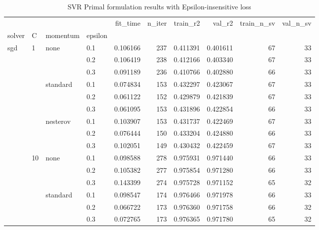 \begin{table}[H]
\centering
\caption{SVR Primal formulation results with Epsilon-insensitive loss}
\label{primal_svr_eps_cv_results}
\begin{tabular}{llllrrrrrr}
\toprule
          &     &   &     &  fit\_time &  n\_iter &  train\_r2 &    val\_r2 &  train\_n\_sv &  val\_n\_sv \\
solver & C & momentum & epsilon &           &         &           &           &             &           \\
\midrule
sgd & 1   & none & 0.1 &  0.106166 &     237 &  0.411391 &  0.401611 &          67 &        33 \\
          &     &   & 0.2 &  0.106419 &     238 &  0.412166 &  0.403340 &          67 &        33 \\
          &     &   & 0.3 &  0.091189 &     236 &  0.410766 &  0.402880 &          66 &        33 \\
          &     & standard & 0.1 &  0.074834 &     153 &  0.432297 &  0.423067 &          67 &        33 \\
          &     &   & 0.2 &  0.061122 &     152 &  0.429879 &  0.421839 &          67 &        33 \\
          &     &   & 0.3 &  0.061095 &     153 &  0.431896 &  0.422854 &          66 &        33 \\
          &     & nesterov & 0.1 &  0.103907 &     153 &  0.431737 &  0.422469 &          67 &        33 \\
          &     &   & 0.2 &  0.076444 &     150 &  0.433204 &  0.424880 &          66 &        33 \\
          &     &   & 0.3 &  0.102051 &     149 &  0.430432 &  0.422459 &          67 &        33 \\
          & 10  & none & 0.1 &  0.098588 &     278 &  0.975931 &  0.971440 &          66 &        33 \\
          &     &   & 0.2 &  0.105382 &     277 &  0.975854 &  0.971280 &          66 &        33 \\
          &     &   & 0.3 &  0.143399 &     274 &  0.975728 &  0.971152 &          65 &        32 \\
          &     & standard & 0.1 &  0.098547 &     174 &  0.976466 &  0.971978 &          66 &        33 \\
          &     &   & 0.2 &  0.066722 &     173 &  0.976360 &  0.971758 &          66 &        32 \\
          &     &   & 0.3 &  0.072765 &     173 &  0.976365 &  0.971780 &          65 &        32 \\

\end{tabular}
\end{table}
